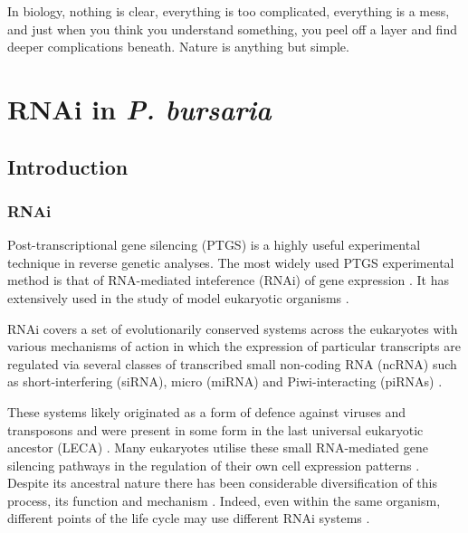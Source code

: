 \graphicspath{{chapters/6.Chapter_4/figures/}}

\begin{savequote}[75mm]
In biology, nothing is clear, everything is too complicated, everything is a mess, 
and just when you think you understand something, you peel off a layer and find 
deeper complications beneath. Nature is anything but simple.
\end{savequote}

\chapter{RNAi in \textit{P. bursaria}}

\section{Introduction}

\subsection{RNAi}

Post-transcriptional gene silencing (PTGS) is a highly useful experimental technique
in reverse genetic analyses.
The most widely used PTGS experimental method is that of RNA-mediated inteference (RNAi)
of gene expression \citep{Fire1998}. It has extensively used in the
study of model eukaryotic organisms \citep{Morf2013,Batista2011,Matthew2004,Ketting2011,Chang2012}.

RNAi covers a set of evolutionarily conserved systems across the eukaryotes 
with various mechanisms of action in which the expression of particular transcripts
are regulated via several classes of transcribed small non-coding RNA (ncRNA)
such as short-interfering (siRNA), micro (miRNA) and Piwi-interacting (piRNAs) \citep{Carthew2009}.

These systems likely originated as a form of defence against
viruses and transposons \citep{Waterhouse2001,Buchon2006}
and were present in some form in the last universal eukaryotic
ancestor (LECA) \citep{Cerutti2006,Shabalina2008}.  Many eukaryotes
utilise these small RNA-mediated gene silencing pathways
in the regulation of their own cell expression patterns \citep{Wu2008}.
Despite its ancestral nature there has been considerable diversification
of this process, its function and mechanism \citep{Ketting2011}.
Indeed, even within the same organism, different points of the life cycle
may use different RNAi systems \citep{Flemr2013}.


